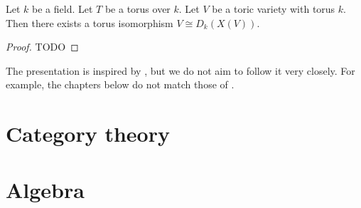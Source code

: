 \begin{theorem}
  \label{5-1-aff-tor-var-iso-diag-aff-mon}

  Let $k$ be a field.
  Let $T$ be a torus over $k$.
  Let $V$ be a toric variety with torus $k$.
  Then there exists a torus isomorphism $V \cong D_k(X(V))$.
\end{theorem}
\begin{proof}

  TODO
\end{proof}





%

The presentation is inspired by \cite{Cox_2011},
but we do not aim to follow it very closely.
For example, the chapters below do not match those of \cite{Cox_2011}.

\chapter{Category theory}




\chapter{Algebra}





